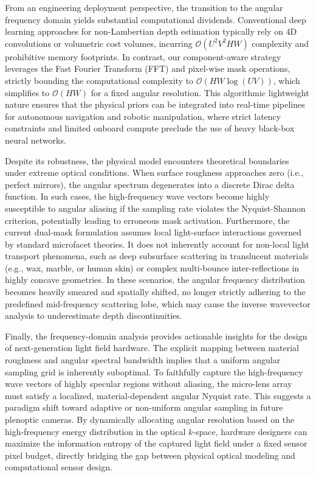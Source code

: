 From an engineering deployment perspective, the transition to the angular frequency domain yields substantial computational dividends. Conventional deep learning approaches for non-Lambertian depth estimation typically rely on 4D convolutions or volumetric cost volumes, incurring $\mathcal{O}(U^2 V^2 HW)$ complexity and prohibitive memory footprints. In contrast, our component-aware strategy leverages the Fast Fourier Transform (FFT) and pixel-wise mask operations, strictly bounding the computational complexity to $\mathcal{O}(HW \log(UV))$, which simplifies to $\mathcal{O}(HW)$ for a fixed angular resolution. This algorithmic lightweight nature ensures that the physical priors can be integrated into real-time pipelines for autonomous navigation and robotic manipulation, where strict latency constraints and limited onboard compute preclude the use of heavy black-box neural networks.

Despite its robustness, the physical model encounters theoretical boundaries under extreme optical conditions. When surface roughness approaches zero (i.e., perfect mirrors), the angular spectrum degenerates into a discrete Dirac delta function. In such cases, the high-frequency wave vectors become highly susceptible to angular aliasing if the sampling rate violates the Nyquist-Shannon criterion, potentially leading to erroneous mask activation. Furthermore, the current dual-mask formulation assumes local light-surface interactions governed by standard microfacet theories. It does not inherently account for non-local light transport phenomena, such as deep subsurface scattering in translucent materials (e.g., wax, marble, or human skin) or complex multi-bounce inter-reflections in highly concave geometries. In these scenarios, the angular frequency distribution becomes heavily smeared and spatially shifted, no longer strictly adhering to the predefined mid-frequency scattering lobe, which may cause the inverse wavevector analysis to underestimate depth discontinuities.

Finally, the frequency-domain analysis provides actionable insights for the design of next-generation light field hardware. The explicit mapping between material roughness and angular spectral bandwidth implies that a uniform angular sampling grid is inherently suboptimal. To faithfully capture the high-frequency wave vectors of highly specular regions without aliasing, the micro-lens array must satisfy a localized, material-dependent angular Nyquist rate. This suggests a paradigm shift toward adaptive or non-uniform angular sampling in future plenoptic cameras. By dynamically allocating angular resolution based on the high-frequency energy distribution in the optical $k$-space, hardware designers can maximize the information entropy of the captured light field under a fixed sensor pixel budget, directly bridging the gap between physical optical modeling and computational sensor design.

